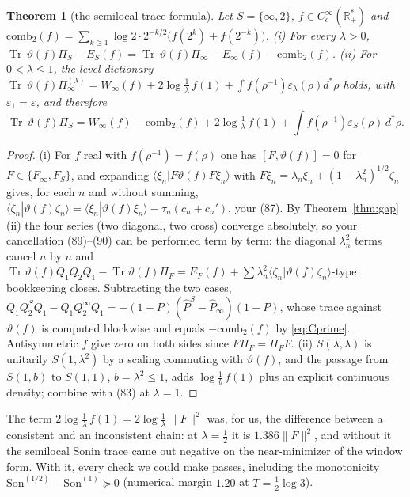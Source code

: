 \documentclass[11pt]{amsart}
\newtheorem{theorem}{Theorem}[section]
\theoremstyle{definition}
\theoremstyle{remark}
\newcommand{\R}{\mathbb R}
\newcommand{\Tr}{\operatorname{Tr}}
\newcommand{\Son}{\mathrm{Son}}
\newcommand{\Pih}{\widehat P}
\begin{document}
\begin{theorem}[the semilocal trace formula]\label{thm:84}
Let $S=\{\infty,2\}$, $f\in C_c^\infty(\R_+^*)$ and $\mathrm{comb}_2(f)=\sum_{k\ge1}\log2\cdot2^{-k/2}\big(f(2^k)+f(2^{-k})\big)$.
\emph{(i)} For every $\lambda>0$,
$\Tr\,\vartheta(f)\Pi_S-E_S(f)=\Tr\,\vartheta(f)\Pi_\infty-E_\infty(f)-\mathrm{comb}_2(f)$.
\emph{(ii)} For $0<\lambda\le1$, the level dictionary
$\Tr\,\vartheta(f)\Pi_\infty^{(\lambda)}=W_\infty(f)+2\log\tfrac1\lambda\,f(1)+\int f(\rho^{-1})\varepsilon_\lambda(\rho)d^*\rho$ holds,
with $\varepsilon_1=\varepsilon$, and therefore
\[
\Tr\,\vartheta(f)\Pi_S=W_\infty(f)-\mathrm{comb}_2(f)+2\log\tfrac1\lambda\,f(1)+\int f(\rho^{-1})\varepsilon_S(\rho)\,d^*\rho .
\]
\end{theorem}
\begin{proof}
(i) For $f$ real with $f(\rho^{-1})=f(\rho)$ one has $[F,\vartheta(f)]=0$ for $F\in\{F_\infty,F_S\}$, and expanding
$\langle\xi_n|F\vartheta(f)F\xi_n\rangle$ with $F\xi_n=\lambda_n\xi_n+(1-\lambda_n^2)^{1/2}\zeta_n$ gives, for each $n$ and without
summing, $\langle\zeta_n|\vartheta(f)\zeta_n\rangle=\langle\xi_n|\vartheta(f)\xi_n\rangle-\tau_n(c_n+c_n')$, your (87). By
Theorem~\ref{thm:gap}(ii) the four series (two diagonal, two cross) converge absolutely, so your cancellation (89)--(90) can be
performed term by term: the diagonal $\lambda_n^2$ terms cancel $n$ by $n$ and
$\Tr\vartheta(f)Q_1Q_2Q_1-\Tr\vartheta(f)\Pi_F=E_F(f)+\sum\lambda_n^2\langle\zeta_n|\vartheta(f)\zeta_n\rangle$-type bookkeeping closes.
Subtracting the two cases, $Q_1Q_2^SQ_1-Q_1Q_2^\infty Q_1=-(1-P)(\Pih^S-\Pih_\infty)(1-P)$, whose trace against $\vartheta(f)$ is
computed blockwise and equals $-\mathrm{comb}_2(f)$ by \eqref{eq:Cprime}. Antisymmetric $f$ give zero on both sides since
$F\Pi_F=\Pi_FF$. (ii) $S(\lambda,\lambda)$ is unitarily $S(1,\lambda^2)$ by a scaling commuting with $\vartheta(f)$, and the
passage from $S(1,b)$ to $S(1,1)$, $b=\lambda^2\le1$, adds $\log\frac1b\,f(1)$ plus an explicit continuous density; combine with
(83) at $\lambda=1$.
\end{proof}

The term $2\log\frac1\lambda\,f(1)=2\log\frac1\lambda\,\|F\|^2$ was, for us, the difference between a consistent and an
inconsistent chain: at $\lambda=\frac12$ it is $1.386\|F\|^2$, and without it the semilocal Sonin trace came out negative on the
near-minimizer of the window form. With it, every check we could make passes, including the monotonicity
$\Son^{(1/2)}-\Son^{(1)}\succeq0$ (numerical margin $1.20$ at $T=\frac12\log3$).
\end{document}
